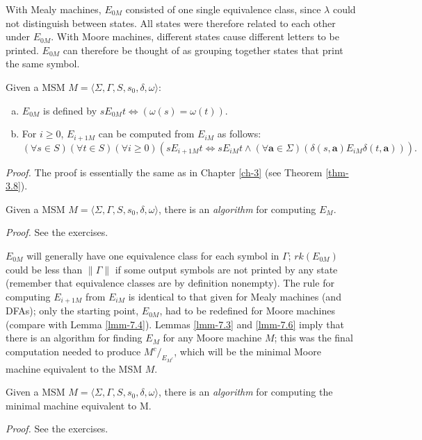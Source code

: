 With Mealy machines, $E_{0M}$ consisted of one single equivalence class, since
$\lambda$ could not distinguish between states. All states were therefore
related to each other under $E_{0M}$. With Moore machines, different states
cause different letters to be printed. $E_{0M}$ can therefore be thought of as
grouping together states that print the same symbol.

\begin{lmm}\label{lmm-7.6}
Given a MSM $M=\langle\Sigma,\Gamma,S,s_0,\delta,\omega\rangle$:
\begin{enumerate}[(a)]
\item $E_{0M}$ is defined by $s E_{0M} t \Leftrightarrow (\omega(s)=\omega(t))$.
\item For $i \geq 0$, $E_{i+1M}$ can be computed from $E_{iM}$ as follows:
\[ (\forall s \in S)(\forall t \in S)(\forall i \geq 0)(s E_{i+1M} t
	\Leftrightarrow s E_{iM} t \wedge (\forall\pmb{a}\in\Sigma)
	(\delta(s,\pmb{a})E_{iM}\delta(t,\pmb{a}))). \]
\end{enumerate}

\emph{Proof.} The proof is essentially the same as in Chapter \ref{ch-3} (see Theorem
\ref{thm-3.8}).
\end{lmm}

\begin{cor}\label{cor-7.10}
Given a MSM $M=\langle\Sigma,\Gamma,S,s_0,\delta,\omega\rangle$, there is an
\emph{algorithm} for computing $E_M$.

\emph{Proof.} See the exercises.
\end{cor}

$E_{0M}$ will generally have one equivalence class for each symbol in $\Gamma$;
$rk(E_{0M})$ could be less than $\|\Gamma\|$ if some output symbols are not
printed by any state (remember that equivalence classes are by definition
nonempty). The rule for computing $E_{i+1M}$ from $E_{iM}$ is identical to that
given for Mealy machines (and DFAs); only the starting point, $E_{0M}$, had to
be redefined for Moore machines (compare with Lemma \ref{lmm-7.4}). Lemmas \ref{lmm-7.3} and \ref{lmm-7.6}
imply that there is an algorithm for finding $E_M$ for any Moore machine $M$;
this was the final computation needed to produce $M^c /  _{E_{M^c}}$, which will be
the minimal Moore machine equivalent to the MSM $M$.

\begin{cor}\label{cor-7.11}
Given a MSM $M=\langle\Sigma,\Gamma,S,s_0,\delta,\omega\rangle$, there is an
\emph{algorithm} for computing the minimal machine equivalent to M.

\emph{Proof.} See the exercises.
\end{cor}

